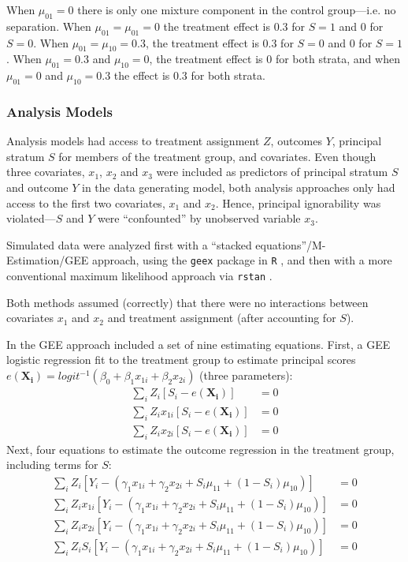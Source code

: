 \documentclass[11pt]{article} %
\newcommand{\ppi}{e(\bm{X_i})}
\begin{document}
When $\mu_{01}=0$ there is only one mixture component in the control
group---i.e. no separation. When $\mu_{01}=\mu_{01}=0$ the treatment effect is
0.3 for $S=1$ and 0 for $S=0$.  When $\mu_{01}=\mu_{10}=0.3$, the
treatment effect is 0.3 for $S=0$ and 0 for $S=1$. When $\mu_{01}=0.3$
and $\mu_{10}=0$, the treatment effect is 0 for both strata, and
when $\mu_{01}=0$ and $\mu_{10}=0.3$ the effect is 0.3 for both
strata.


\subsubsection{Analysis Models}
Analysis models had access to treatment assignment $Z$, outcomes $Y$,
principal stratum $S$ for members of the treatment group, and
covariates.
Even though three covariates, $x_1$, $x_2$ and $x_3$ were included as
predictors of principal stratum $S$ and outcome $Y$ in the data
generating model, both analysis approaches only had access to the
first two covariates, $x_1$ and $x_2$.
Hence, principal ignorability was violated---$S$ and $Y$ were
``confounted'' by unobserved variable $x_3$. 

Simulated data were analyzed first with a ``stacked equations''/M-Estimation/GEE
approach, using the \texttt{geex} package in \texttt{R}
\citep{geex,rcite}, and then with a more conventional maximum
likelihood approach via \texttt{rstan} \citep{rstan}.

Both methods assumed (correctly) that there were no interactions
between covariates $x_1$ and $x_2$ and treatment assignment (after
accounting for $S$). 

In the GEE approach included a set of nine estimating equations.
First, a GEE logistic regression fit to the treatment group to
estimate principal scores
$\ppi=logit^{-1}(\beta_0+\beta_1x_{1i}+\beta_2x_{2i})$ (three parameters):
\begin{align*}
  \sum_iZ_i\left[S_i-\ppi\right]&=0\\
  \sum_iZ_ix_{1i}\left[S_i-\ppi\right]&=0\\
  \sum_iZ_ix_{2i}\left[S_i-\ppi\right]&=0
\end{align*}
Next, four equations to estimate the outcome regression in the
treatment group, including terms for $S$:
\begin{align*}
  \sum_i
  Z_i\left[Y_i-(\gamma_1x_{1i}+\gamma_2x_{2i}+S_i\mu_{11}+(1-S_i)\mu_{10})\right]&=0\\
  \sum_i
  Z_ix_{1i}\left[Y_i-(\gamma_1x_{1i}+\gamma_2x_{2i}+S_i\mu_{11}+(1-S_i)\mu_{10})\right]&=0\\
  \sum_i
  Z_ix_{2i}\left[Y_i-(\gamma_1x_{1i}+\gamma_2x_{2i}+S_i\mu_{11}+(1-S_i)\mu_{10})\right]&=0\\
  \sum_i
  Z_iS_i\left[Y_i-(\gamma_1x_{1i}+\gamma_2x_{2i}+S_i\mu_{11}+(1-S_i)\mu_{10})\right]&=0
\end{align*}
\end{document}
